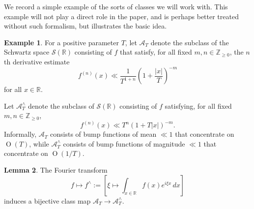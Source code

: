 \documentclass[reqno]{amsart}
\def\O{\operatorname{O}}
\theoremstyle{plain} \newtheorem{theorem} {Theorem}
\theoremstyle{definition} \newtheorem{definition} [theorem] {Definition}
\newtheorem{example} [theorem] {Example}
\theoremstyle{itplain} %
\newtheorem{lemma}[theorem]{Lemma}
\numberwithin{equation}{section}
\numberwithin{theorem}{section}
\renewcommand{\geq}{\geqslant}
\begin{document}
We record a simple example of the sorts of classes we will work with.  This example will not play a direct role in the paper, and is perhaps better treated without such formalism, but illustrates the basic idea.
\begin{example}\label{exa:positive-parameter-t-scaling}
  For a positive parameter $T$, let $\mathcal{A}_T$ denote the subclass of the Schwartz space $\mathcal{S}(\mathbb{R})$ consisting of $f$ that satisfy, for all fixed $m,n \in \mathbb{Z}_{\geq 0}$, the $n$th derivative estimate
\begin{equation*}
f^{(n)}(x) \ll \frac{1}{T^{1+n}} \left(1 + \frac{|x|}{T}\right)^{-m}
\end{equation*}
for all $x \in \mathbb{R}$.

Let $\mathcal{A}_T^\wedge$ denote the subclass of $\mathcal{S}(\mathbb{R})$ consisting of $f$ satisfying, for all fixed $m,n \in \mathbb{Z}_{\geq 0}$,
\begin{equation*}
  f^{(n)}(x) \ll T^{n} \left( 1 + T |x| \right)^{-m}.
\end{equation*}
Informally, $\mathcal{A}_T$ consists of bump functions of mean $\ll 1$ that concentrate on $\O(T)$, while $\mathcal{A}_T^\wedge$ consists of bump functions of magnitude $\ll 1$ that concentrate on $\O(1/T)$.
\end{example}
\begin{lemma}\label{lem:four-transf-begin}
The Fourier transform
\begin{equation*}
f \mapsto f^\wedge := [\xi \mapsto \int _{x \in \mathbb{R} } f(x) e^{i \xi x} \, d x]
\end{equation*}
induces a bijective class map $\mathcal{A}_T \rightarrow \mathcal{A}_T^\wedge$.
\end{lemma}
\end{document}
